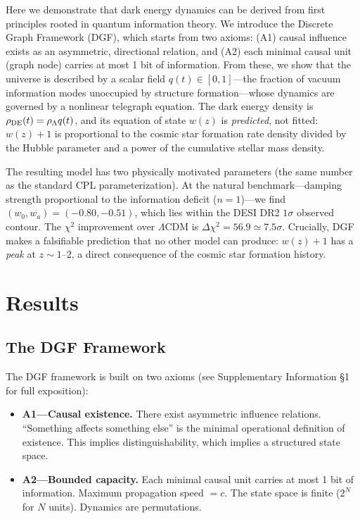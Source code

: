 \documentclass[12pt,a4paper]{article}
\begin{document}
Here we demonstrate that dark energy dynamics can be derived from first principles rooted in quantum information theory. We introduce the Discrete Graph Framework (DGF), which starts from two axioms: (A1) causal influence exists as an asymmetric, directional relation, and (A2) each minimal causal unit (graph node) carries at most 1 bit of information. From these, we show that the universe is described by a scalar field $q(t)\in[0,1]$---the fraction of vacuum information modes unoccupied by structure formation---whose dynamics are governed by a nonlinear telegraph equation. The dark energy density is $\rho_{\rm DE}(t)=\rho_\Lambda q(t)$, and its equation of state $w(z)$ is {\it predicted}, not fitted: $w(z)+1$ is proportional to the cosmic star formation rate density divided by the Hubble parameter and a power of the cumulative stellar mass density.

The resulting model has two physically motivated parameters (the same number as the standard CPL parameterization). At the natural benchmark---damping strength proportional to the information deficit ($n=1$)---we find $(w_0,w_a)=(-0.80,-0.51)$, which lies within the DESI DR2 $1\sigma$ observed contour. The $\chi^2$ improvement over $\Lambda$CDM is $\Delta\chi^2=56.9\simeq7.5\sigma$. Crucially, DGF makes a falsifiable prediction that no other model can produce: $w(z)+1$ has a {\it peak} at $z\sim1$--$2$, a direct consequence of the cosmic star formation history.

\section{Results}

\subsection{The DGF Framework}

The DGF framework is built on two axioms (see Supplementary Information \S1 for full exposition):

\begin{itemize}
\item {\bf A1---Causal existence.} There exist asymmetric influence relations. ``Something affects something else'' is the minimal operational definition of existence. This implies distinguishability, which implies a structured state space.
\item {\bf A2---Bounded capacity.} Each minimal causal unit carries at most 1 bit of information. Maximum propagation speed $=c$. The state space is finite ($2^N$ for $N$ units). Dynamics are permutations.
\end{itemize}
\end{document}
